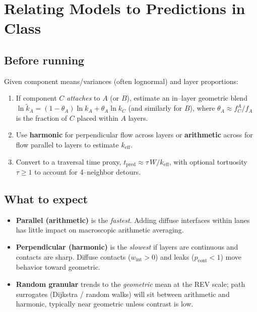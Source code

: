 \documentclass[11pt,a4paper]{article}
\begin{document}
\section{Relating Models to Predictions in Class}
\subsection*{Before running}
Given component means/variances (often lognormal) and layer proportions:
\begin{enumerate}
  \item If component $C$ \emph{attaches} to $A$ (or $B$), estimate an in--layer geometric blend
  $\ln \tilde{k}_A = (1-\theta_A)\ln k_A + \theta_A \ln k_C$ (and similarly for $B$),
  where $\theta_A \approx f_C^{A}/f_A$ is the fraction of $C$ placed within $A$ layers.
  \item Use \textbf{harmonic} for perpendicular flow across layers or \textbf{arithmetic} across for flow parallel to layers to estimate $k_{\text{eff}}$.
  \item Convert to a traversal time proxy, $t_{\text{pred}} \approx \tau\,W/k_{\text{eff}}$,
  with optional tortuosity $\tau\ge1$ to account for 4--neighbor detours.
\end{enumerate}

\subsection*{What to expect}
\begin{itemize}
  \item \textbf{Parallel (arithmetic)} is the \emph{fastest}. Adding diffuse interfaces within lanes has little impact on macroscopic arithmetic averaging.
  \item \textbf{Perpendicular (harmonic)} is the \emph{slowest} if layers are continuous and contacts are sharp. Diffuse contacts ($w_{\text{int}}>0$) and leaks ($p_{\text{cont}}<1$) move behavior toward geometric.
  \item \textbf{Random granular} trends to the \emph{geometric} mean at the REV scale; path surrogates (Dijkstra / random walks) will sit between arithmetic and harmonic, typically near geometric unless contrast is low.
\end{itemize}
\end{document}
